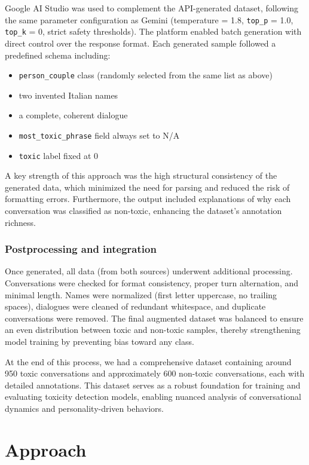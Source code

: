 \documentclass[conference]{IEEEtran}
\begin{document}
Google AI Studio was used to complement the API-generated dataset, following the same parameter configuration as Gemini (temperature = 1.8, \texttt{top\_p} = 1.0, \texttt{top\_k} = 0, strict safety thresholds). The platform enabled batch generation with direct control over the response format. Each generated sample followed a predefined schema including:  
\begin{itemize}
    \item \texttt{person\_couple} class (randomly selected from the same list as above)
    \item two invented Italian names
    \item a complete, coherent dialogue
    \item \texttt{most\_toxic\_phrase} field always set to N/A
    \item \texttt{toxic} label fixed at 0
\end{itemize}
A key strength of this approach was the high structural consistency of the generated data, which minimized the need for parsing and reduced the risk of formatting errors. Furthermore, the output included explanations of why each conversation was classified as non-toxic, enhancing the dataset’s annotation richness.

\subsubsection{Postprocessing and integration}

Once generated, all data (from both sources) underwent additional processing. Conversations were checked for format consistency, proper turn alternation, and minimal length. Names were normalized (first letter uppercase, no trailing spaces), dialogues were cleaned of redundant whitespace, and duplicate conversations were removed. The final augmented dataset was balanced to ensure an even distribution between toxic and non-toxic samples, thereby strengthening model training by preventing bias toward any class.

At the end of this process, we had a comprehensive dataset containing around 950 toxic conversations and approximately 600 non-toxic conversations, each with detailed annotations. This dataset serves as a robust foundation for training and evaluating toxicity detection models, enabling nuanced analysis of conversational dynamics and personality-driven behaviors.

\section{Approach}
\end{document}

